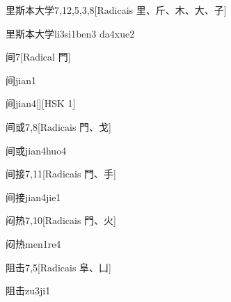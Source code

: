 \begin{entry}{里斯本大学}{7,12,5,3,8}[Radicais ⾥、⽄、⽊、⼤、⼦]
  \begin{phonetics}{里斯本大学}{li3si1ben3 da4xue2}
  \end{phonetics}
\end{entry}

\begin{entry}{间}{7}[Radical ⾨]
  \begin{phonetics}{间}{jian1}
  \end{phonetics}
  \begin{phonetics}{间}{jian4}[][HSK 1]
  \end{phonetics}
\end{entry}

\begin{entry}{间或}{7,8}[Radicais ⾨、⼽]
  \begin{phonetics}{间或}{jian4huo4}
  \end{phonetics}
\end{entry}

\begin{entry}{间接}{7,11}[Radicais ⾨、⼿]
  \begin{phonetics}{间接}{jian4jie1}
  \end{phonetics}
\end{entry}

\begin{entry}{闷热}{7,10}[Radicais ⾨、⽕]
  \begin{phonetics}{闷热}{men1re4}
  \end{phonetics}
\end{entry}

\begin{entry}{阻击}{7,5}[Radicais ⾩、⼐]
  \begin{phonetics}{阻击}{zu3ji1}
  \end{phonetics}
\end{entry}

